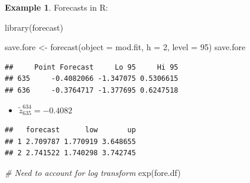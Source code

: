 \documentclass[
]{book}
\newenvironment{Shaded}{\begin{snugshade}}{\end{snugshade}}
\newcommand{\AttributeTok}[1]{\textcolor[rgb]{0.77,0.63,0.00}{#1}}
\newcommand{\CommentTok}[1]{\textcolor[rgb]{0.56,0.35,0.01}{\textit{#1}}}
\newcommand{\DecValTok}[1]{\textcolor[rgb]{0.00,0.00,0.81}{#1}}
\newcommand{\FunctionTok}[1]{\textcolor[rgb]{0.00,0.00,0.00}{#1}}
\newcommand{\NormalTok}[1]{#1}
\newcommand{\OtherTok}[1]{\textcolor[rgb]{0.56,0.35,0.01}{#1}}
\newcommand{\SpecialCharTok}[1]{\textcolor[rgb]{0.00,0.00,0.00}{#1}}
\providecommand{\tightlist}{%
  \setlength{\itemsep}{0pt}\setlength{\parskip}{0pt}}
\theoremstyle{definition}
\theoremstyle{definition}
\newtheorem{example}{Example}[chapter]
\theoremstyle{definition}
\theoremstyle{definition}
\theoremstyle{remark}
\begin{document}
\begin{example}
Forecasts in R:

\begin{Shaded}
\begin{Highlighting}[]
\FunctionTok{library}\NormalTok{(forecast)}

\NormalTok{save.fore }\OtherTok{\textless{}{-}} \FunctionTok{forecast}\NormalTok{(}\AttributeTok{object =}\NormalTok{ mod.fit, }\AttributeTok{h =} \DecValTok{2}\NormalTok{, }\AttributeTok{level =} \DecValTok{95}\NormalTok{)}
\NormalTok{save.fore}
\end{Highlighting}
\end{Shaded}

\begin{verbatim}
##     Point Forecast     Lo 95     Hi 95
## 635     -0.4082066 -1.347075 0.5306615
## 636     -0.3764717 -1.377695 0.6247518
\end{verbatim}

\begin{itemize}
\tightlist
\item
  \(\tilde z^{634}_{635}=-0.4082\)
\end{itemize}

\begin{Shaded}
\end{Shaded}

\begin{verbatim}
##   forecast      low       up
## 1 2.709787 1.770919 3.648655
## 2 2.741522 1.740298 3.742745
\end{verbatim}

\begin{Shaded}
\begin{Highlighting}[]
\CommentTok{\# Need to account for log transform}
\FunctionTok{exp}\NormalTok{(fore.df)}
\end{Highlighting}
\end{Shaded}


\end{example}
\end{document}
